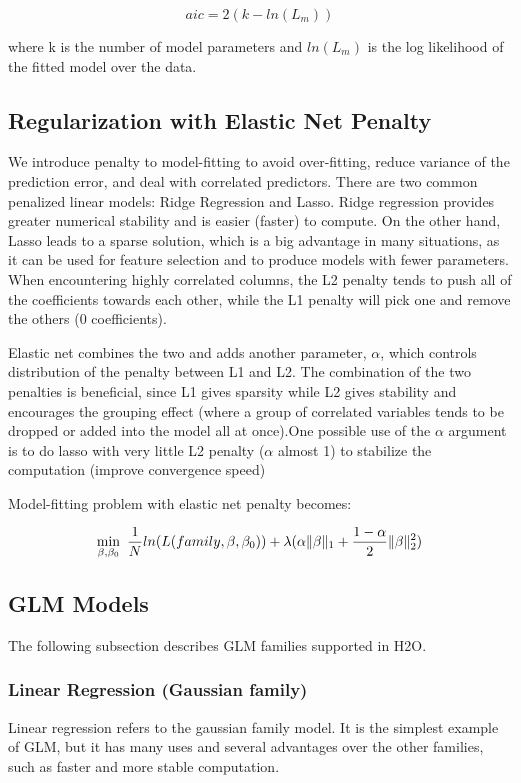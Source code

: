 \documentclass[11pt]{article}
\begin{document}
\[ aic = 2(k - ln(L_{m}))\]

\noindent
where k is the number of model parameters and $ln(L_{m})$ is the log likelihood of the fitted model over the data.

\subsection{Regularization with Elastic Net Penalty} 
We introduce penalty to model-fitting to avoid over-fitting, reduce variance of the prediction error, and deal with correlated predictors. There are two common penalized linear models: Ridge Regression and Lasso. Ridge regression provides greater numerical stability and is easier (faster) to compute. On the other hand, Lasso leads to a sparse solution, which is a big advantage in many situations, as it can be used for feature selection and to produce models with fewer parameters. When encountering highly correlated columns, the L2 penalty tends to push all of the coefficients towards each other, while the L1 penalty will pick one and remove the others (0 coefficients).

Elastic net combines the two and adds another parameter, $\alpha$, which controls distribution of the penalty between L1 and L2. The combination of the two penalties is beneficial, since L1 gives sparsity while L2 gives stability and encourages the grouping effect (where a group of correlated variables tends to be dropped or added into the model all at once).One possible use of the $\alpha$ argument is to do lasso with very little L2 penalty ($\alpha$ almost 1) to stabilize the computation (improve convergence speed)

Model-fitting problem with elastic net penalty becomes:

\[ \min\limits_{\beta,\beta_0}\ {{1\over{N}} ln(L(family,\beta,\beta_0))  + \lambda (\alpha \| \beta \|_1}  + {1- \alpha \over 2} \| \beta \|_2^2) \]


\subsection{GLM Models} 
The following subsection describes GLM families supported in H2O. 

\subsubsection{Linear Regression (Gaussian family) }
Linear regression refers to the gaussian family model. It is the simplest example of GLM, but it has many uses and several advantages over the other families, such as faster and more stable computation. 
\end{document}
